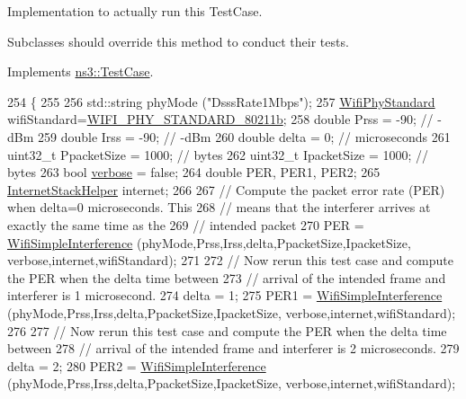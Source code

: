 Implementation to actually run this Test\+Case. 

Subclasses should override this method to conduct their tests. 

Implements \hyperlink{classns3_1_1TestCase_a8ff74680cf017ed42011e4be51917a24}{ns3\+::\+Test\+Case}.


\begin{DoxyCode}
254 \{
255 
256   std::string phyMode (\textcolor{stringliteral}{"DsssRate1Mbps"});
257   \hyperlink{group__wifi_ga1299834f4e1c615af3ca738033b76a49}{WifiPhyStandard} wifiStandard=\hyperlink{group__wifi_gga1299834f4e1c615af3ca738033b76a49a77e1cc9f77a0bce8e2bc82cbef437b5a}{WIFI\_PHY\_STANDARD\_80211b};
258   \textcolor{keywordtype}{double} Prss = -90;  \textcolor{comment}{// -dBm}
259   \textcolor{keywordtype}{double} Irss = -90;  \textcolor{comment}{// -dBm}
260   \textcolor{keywordtype}{double} delta = 0;  \textcolor{comment}{// microseconds}
261   uint32\_t PpacketSize = 1000; \textcolor{comment}{// bytes}
262   uint32\_t IpacketSize = 1000; \textcolor{comment}{// bytes}
263   \textcolor{keywordtype}{bool} \hyperlink{openflow-switch_8cc_ab3f078684998b83967d507d0f453f454}{verbose} = \textcolor{keyword}{false};
264   \textcolor{keywordtype}{double} PER, PER1, PER2;
265   \hyperlink{classns3_1_1InternetStackHelper}{InternetStackHelper} internet;
266 
267   \textcolor{comment}{// Compute the packet error rate (PER) when delta=0 microseconds.  This}
268   \textcolor{comment}{// means that the interferer arrives at exactly the same time as the}
269   \textcolor{comment}{// intended packet}
270   PER = \hyperlink{classWifiInterferenceTestCase_a360c9c443551246707b58ee879c37a5a}{WifiSimpleInterference} (phyMode,Prss,Irss,delta,PpacketSize,IpacketSize,
      verbose,internet,wifiStandard);
271 
272   \textcolor{comment}{// Now rerun this test case and compute the PER when the delta time between}
273   \textcolor{comment}{// arrival of the intended frame and interferer is 1 microsecond.}
274   delta = 1;
275   PER1 = \hyperlink{classWifiInterferenceTestCase_a360c9c443551246707b58ee879c37a5a}{WifiSimpleInterference} (phyMode,Prss,Irss,delta,PpacketSize,IpacketSize,
      verbose,internet,wifiStandard);
276 
277   \textcolor{comment}{// Now rerun this test case and compute the PER when the delta time between}
278   \textcolor{comment}{// arrival of the intended frame and interferer is 2 microseconds.}
279   delta = 2;
280   PER2 = \hyperlink{classWifiInterferenceTestCase_a360c9c443551246707b58ee879c37a5a}{WifiSimpleInterference} (phyMode,Prss,Irss,delta,PpacketSize,IpacketSize,
      verbose,internet,wifiStandard);

\end{DoxyCode}

